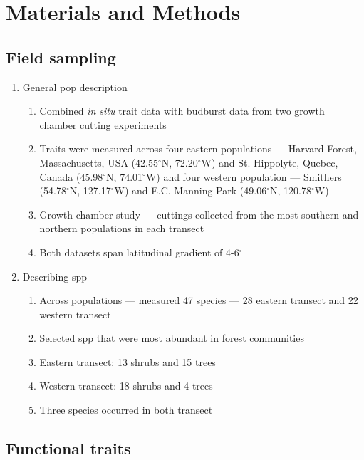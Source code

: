 \documentclass{article}
\begin{document}



\section*{Materials and Methods}
\subsection*{Field sampling}
\begin{enumerate}
\item General pop description
\begin{enumerate}
\item Combined \emph{in situ} trait data with budburst data from two growth chamber cutting experiments
\item Traits were measured across four eastern populations --- Harvard Forest, Massachusetts, USA (42.55$^{\circ}$N, 72.20$^{\circ}$W) and St. Hippolyte, Quebec, Canada (45.98$^{\circ}$N, 74.01$^{\circ}$W) and four western population --- Smithers (54.78$^{\circ}$N, 127.17$^{\circ}$W) and E.C. Manning Park (49.06$^{\circ}$N, 120.78$^{\circ}$W)
\item Growth chamber study --- cuttings collected from the most southern and northern populations in each transect
\item Both datasets span latitudinal gradient of 4-6$^{\circ}$
\end{enumerate}

\item Describing spp
\begin{enumerate}
\item Across populations --- measured 47 species --- 28 eastern transect and 22 western transect
\item Selected spp that were most abundant in forest communities
\item Eastern transect: 13 shrubs and 15 trees
\item Western transect: 18 shrubs and 4 trees
\item Three species occurred in both transect
\end{enumerate}
\end{enumerate}

\subsection*{Functional traits}
\end{document}
